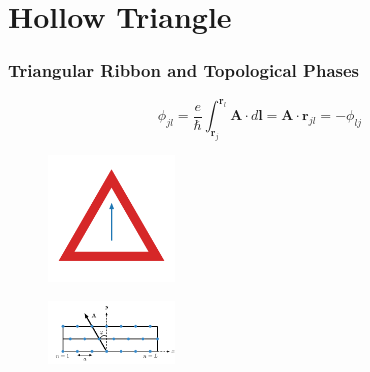 \documentclass[xcolor=dvipsnames,10pt,aspectratio=169]{beamer}
\renewcommand{\vec}[1]{\mathbf{#1}}
\newcommand{\HT}{Hollow Triangle}
\begin{document}
  \section{\HT}

  \begin{frame}
    \frametitle{Triangular Ribbon and Topological Phases}

    \begin{multicols}{2}
      \small
      \begin{equation*}
        \phi_{jl} = \dfrac{e}{\hbar}\int_{\vec{r}_j}^{\vec{r}_l} \vec{A} \cdot d\vec{l} = \vec{A}\cdot\vec{r}_{jl} = -\phi_{lj}
      \end{equation*}
      \vspace{-08mm}
      \begin{figure}
        \includegraphics[width=0.30\textwidth]{./figures/hollow-triangle-constant-vector-potential.pdf}
      \end{figure}

      \vspace{-15mm}
      \begin{figure}
        \includegraphics[width=0.3\textwidth]{./figures/triangular-lattice-finite-width-ribbon.pdf}
      \end{figure}

      \pause


\end{multicols}
\end{frame}
\end{document}
